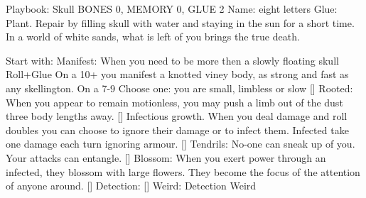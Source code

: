 Playbook: Skull
BONES 0, MEMORY 0, GLUE 2  
Name: eight letters 
Glue: Plant. Repair by filling skull with water and staying in the sun for a short time.
In a world of white sands, what is left of you brings the true death. 

Start with: Manifest: When you need to be more then a slowly floating skull Roll+Glue
On a 10+ you manifest a knotted viney body, as strong and fast as any skellington.
On a 7-9 Choose one: you are small, limbless or slow
[] Rooted: When you appear to remain motionless, you may push a limb out of the dust three body lengths away.
[] Infectious growth. When you deal damage and roll doubles you can choose to ignore their damage or to infect them. Infected take one damage each turn ignoring armour.
[] Tendrils: No-one can sneak up of you. Your attacks can entangle.
[] Blossom: When you exert power through an infected, they blossom with large flowers. They become the focus of the attention of anyone around.
[] Detection: 
[] Weird:
				Detection					Weird


